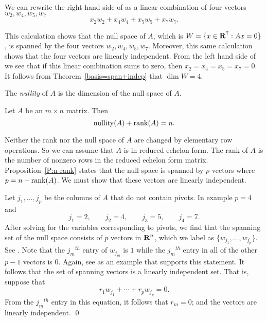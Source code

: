 \documentclass{ximera}
\begin{document}
\noindent We can rewrite the right hand side of 
as a linear combination of four
vectors $w_2,w_4,w_5,w_7$
\begin{equation}   \label{e:w'scomb}
x_2w_2 + x_4w_4 + x_5w_5 + x_7w_7.
\end{equation}

This calculation shows that the null space of $A$, which is
$W=\{x\in\mbox{$\bf{R}$}^7:Ax=0\}$, is spanned by the four vectors
$w_2,w_4,w_5,w_7$.  Moreover, this same calculation shows that
the four vectors  are linearly independent.
From the left hand side of  we see that if this
linear combination sums to zero, then $x_2=x_4=x_5=x_7=0$.  It
follows from Theorem~\ref{basis=span+indep} that $\dim W = 4$.

\begin{Def}  \label{D:nullity}
The {\em nullity\/} of $A$ is the dimension of the null space of $A$.
\end{Def} 

\begin{thm}  \label{T:dimsoln}
Let $A$ be an $m\times n$ matrix. Then
\[
{\rm nullity}(A) + {\rm rank}(A) = n.
\]
\end{thm} 

\proof	Neither the rank nor the null space of $A$ are changed by
elementary row operations.  So we can assume that $A$ is in reduced
echelon form.  The rank of $A$ is the number of nonzero rows in
the reduced echelon form matrix.  Proposition~\ref{P:n-rank} states that
the null space is spanned by $p$ vectors where $p=n-{\rm rank}(A)$.  We
must show that these vectors are linearly independent.

Let $j_1,\ldots,j_p$ be the columns of $A$ that do not contain pivots.
In example  $p=4$ and
\[
j_1 = 2, \qquad j_2 = 4, \qquad j_3 = 5, \qquad j_4 = 7.
\]
After solving for the variables corresponding to pivots, we find that
the spanning set of the null space consists of $p$ vectors in $\mbox{$\bf{R}$}^n$,
which we label as $\{w_{j_1},\ldots,w_{j_p}\}$.  See .
Note that the $j_m$$^{th}$  entry of $w_{j_m}$ is $1$ while the
$j_m$$^{th}$ entry in all of the other $p-1$ vectors is $0$.  Again,
see  as an example that supports this statement.  It
follows that the set of spanning vectors is a linearly independent set.
That is, suppose that
\[
r_1w_{j_1} + \cdots + r_pw_{j_p} = 0.
\]
From the $j_m$$^{th}$ entry in this equation, it follows that $r_m=0$;
and the vectors are linearly independent.  \qed
\end{document}
